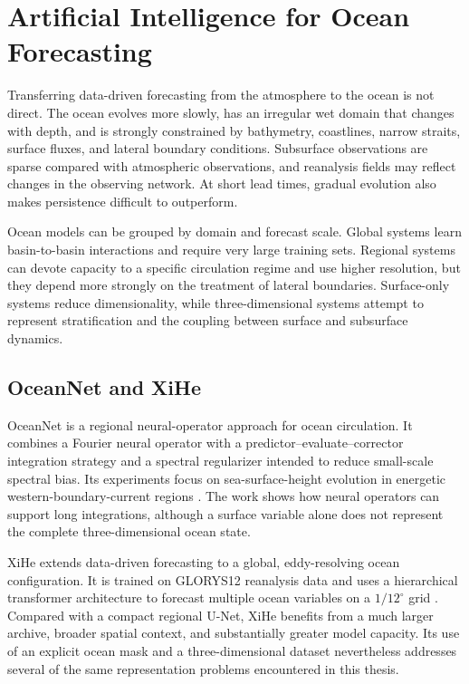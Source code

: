 \section{Artificial Intelligence for Ocean Forecasting}

Transferring data-driven forecasting from the atmosphere to the ocean is not direct. The ocean evolves more slowly, has an irregular wet domain that changes with depth, and is strongly constrained by bathymetry, coastlines, narrow straits, surface fluxes, and lateral boundary conditions. Subsurface observations are sparse compared with atmospheric observations, and reanalysis fields may reflect changes in the observing network. At short lead times, gradual evolution also makes persistence difficult to outperform.

Ocean models can be grouped by domain and forecast scale. Global systems learn basin-to-basin interactions and require very large training sets. Regional systems can devote capacity to a specific circulation regime and use higher resolution, but they depend more strongly on the treatment of lateral boundaries. Surface-only systems reduce dimensionality, while three-dimensional systems attempt to represent stratification and the coupling between surface and subsurface dynamics.

\subsection{OceanNet and XiHe}

OceanNet is a regional neural-operator approach for ocean circulation. It combines a Fourier neural operator with a predictor--evaluate--corrector integration strategy and a spectral regularizer intended to reduce small-scale spectral bias. Its experiments focus on sea-surface-height evolution in energetic western-boundary-current regions \citep{chattopadhyay2023oceannet}. The work shows how neural operators can support long integrations, although a surface variable alone does not represent the complete three-dimensional ocean state.

XiHe extends data-driven forecasting to a global, eddy-resolving ocean configuration. It is trained on GLORYS12 reanalysis data and uses a hierarchical transformer architecture to forecast multiple ocean variables on a $1/12^{\circ}$ grid \citep{wang2024xihe}. Compared with a compact regional U-Net, XiHe benefits from a much larger archive, broader spatial context, and substantially greater model capacity. Its use of an explicit ocean mask and a three-dimensional dataset nevertheless addresses several of the same representation problems encountered in this thesis.

